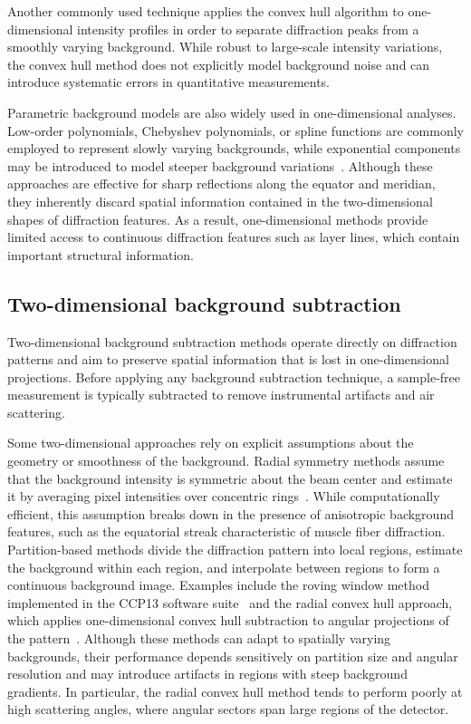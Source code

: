 \documentclass[iucr,review]{iucrjournals}
\begin{document}
Another commonly used technique applies the convex hull algorithm to one-dimensional intensity profiles in order to separate diffraction peaks from a smoothly varying background. While robust to large-scale intensity variations, the convex hull method does not explicitly model background noise and can introduce systematic errors in quantitative measurements.

Parametric background models are also widely used in one-dimensional analyses. Low-order polynomials, Chebyshev polynomials, or spline functions are commonly employed to represent slowly varying backgrounds, while exponential components may be introduced to model steeper background variations~\cite{rajkumar2007fibrefix}. Although these approaches are effective for sharp reflections along the equator and meridian, they inherently discard spatial information contained in the two-dimensional shapes of diffraction features. As a result, one-dimensional methods provide limited access to continuous diffraction features such as layer lines, which contain important structural information.

\subsection{Two-dimensional background subtraction}

Two-dimensional background subtraction methods operate directly on diffraction patterns and aim to preserve spatial information that is lost in one-dimensional projections. Before applying any background subtraction technique, a sample-free measurement is typically subtracted to remove instrumental artifacts and air scattering.

Some two-dimensional approaches rely on explicit assumptions about the geometry or smoothness of the background. Radial symmetry methods assume that the background intensity is symmetric about the beam center and estimate it by averaging pixel intensities over concentric rings~\cite{rajkumar2007fibrefix}. While computationally efficient, this assumption breaks down in the presence of anisotropic background features, such as the equatorial streak characteristic of muscle fiber diffraction. Partition-based methods divide the diffraction pattern into local regions, estimate the background within each region, and interpolate between regions to form a continuous background image. Examples include the roving window method implemented in the CCP13 software suite~\cite{HeEtAl2007} and the radial convex hull approach, which applies one-dimensional convex hull subtraction to angular projections of the pattern~\cite{MuscleXQuadrantFolding}. Although these methods can adapt to spatially varying backgrounds, their performance depends sensitively on partition size and angular resolution and may introduce artifacts in regions with steep background gradients. In particular, the radial convex hull method tends to perform poorly at high scattering angles, where angular sectors span large regions of the detector.
\end{document}
